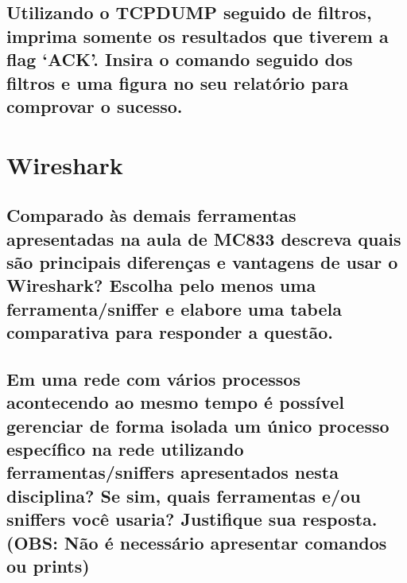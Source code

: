 \documentclass[12pt,a4paper]{report}
\begin{document}
\subsection{Utilizando o TCPDUMP seguido de filtros, imprima somente os resultados que tiverem a flag ‘ACK’. Insira o comando seguido dos filtros e uma figura no seu relatório para comprovar o sucesso.}

\section{Wireshark}


\subsection{Comparado às demais ferramentas apresentadas na aula de MC833 descreva quais são principais diferenças e vantagens de usar o Wireshark? Escolha pelo menos uma ferramenta/sniffer e elabore uma tabela comparativa para responder a questão.}

\subsection{Em uma rede com vários processos acontecendo ao mesmo tempo é possível gerenciar de forma isolada um único processo específico na rede utilizando ferramentas/sniffers apresentados nesta disciplina? Se sim, quais ferramentas e/ou sniffers você usaria? Justifique sua resposta. (OBS: Não é necessário apresentar comandos ou prints)}
\end{document}

